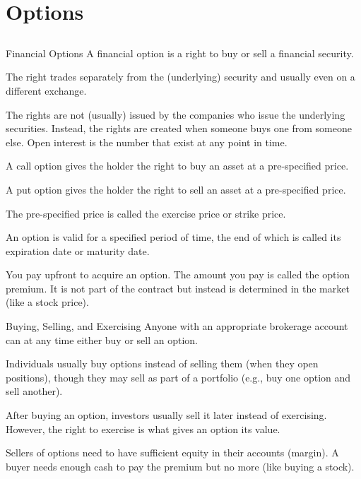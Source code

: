 \documentclass[xcolor=dvipsnames,10pt]{beamer}
\begin{document}
\section{Options}\subsection{}

\begin{frame}{Financial Options}
    A financial option is a right to buy or sell  a financial security.
    
    The right trades separately from the (underlying) security and usually even on a different exchange.
    
    The rights are not (usually) issued by the companies who issue the underlying securities.  Instead, the rights are created when someone buys one from someone else.  Open interest is the number that exist at any point in time.
    
\end{frame}
\begin{frame}
A \alert{call} option gives the holder the right to \alert{buy} an asset at a pre-specified price.

A \alert{put} option gives the holder the right to \alert{sell} an asset at a pre-specified price.

The pre-specified price is called the exercise price or strike price.  

An option is valid for a specified period of time, the end of which is called its expiration date or maturity date.

You pay upfront to acquire an option.  The amount you pay is called the option premium.  It is not part of the contract but instead is determined in the market (like a stock price).
\end{frame}

\begin{frame}{Buying, Selling, and Exercising}
    Anyone with an appropriate brokerage account can at any time either buy or sell an option.
    
    Individuals usually buy options instead of selling them (when they open positions), though they may sell as part of a portfolio (e.g., buy one option and sell another).
    
    After buying an option, investors usually sell it later instead of exercising.  However, the right to exercise is what gives an option its value.
    
    Sellers of options need to have sufficient equity in their accounts (margin).  A buyer needs enough cash to pay the premium but no more (like buying a stock).
\end{frame}
\end{document}
